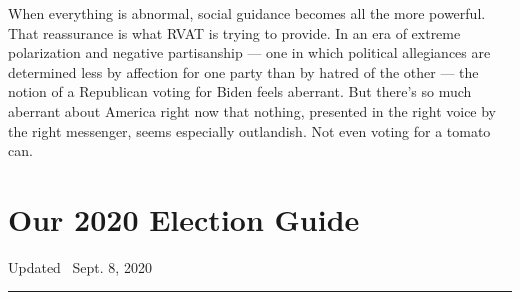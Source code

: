 When everything is abnormal, social guidance becomes all the more
powerful. That reassurance is what RVAT is trying to provide. In an era
of extreme polarization and negative partisanship --- one in which
political allegiances are determined less by affection for one party
than by hatred of the other --- the notion of a Republican voting for
Biden feels aberrant. But there's so much aberrant about America right
now that nothing, presented in the right voice by the right messenger,
seems especially outlandish. Not even voting for a tomato can.

\hypertarget{our-2020-election-guide}{%
\section{Our 2020 Election Guide}\label{our-2020-election-guide}}

Updated ~Sept. 8, 2020

\begin{center}\rule{0.5\linewidth}{\linethickness}\end{center}

